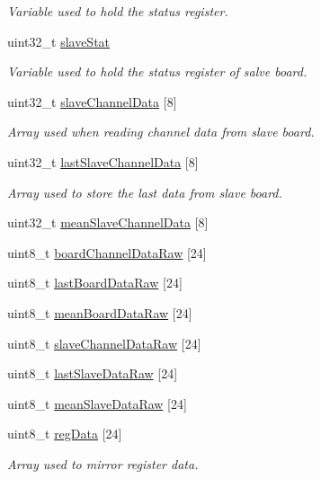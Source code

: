 \begin{DoxyCompactItemize}
\begin{DoxyCompactList}\small\item\em Variable used to hold the status register. \end{DoxyCompactList}\item 
uint32\+\_\+t \hyperlink{group___a_d_s1299___library_ga107f0202d1ef78dcc5b63e143044ffdf}{slave\+Stat}
\begin{DoxyCompactList}\small\item\em Variable used to hold the status register of salve board. \end{DoxyCompactList}\item 
uint32\+\_\+t \hyperlink{group___a_d_s1299___library_ga35a75511ee01afa88d18d47b2a6b401b}{slave\+Channel\+Data} \mbox{[}8\mbox{]}
\begin{DoxyCompactList}\small\item\em Array used when reading channel data from slave board. \end{DoxyCompactList}\item 
uint32\+\_\+t \hyperlink{group___a_d_s1299___library_gaf412b1daf072ddca4def438f97d2c65c}{last\+Slave\+Channel\+Data} \mbox{[}8\mbox{]}
\begin{DoxyCompactList}\small\item\em Array used to store the last data from slave board. \end{DoxyCompactList}\item 
uint32\+\_\+t \hyperlink{group___a_d_s1299___library_ga07120ea83782df5ae895c52616d4b26c}{mean\+Slave\+Channel\+Data} \mbox{[}8\mbox{]}
\item 
uint8\+\_\+t \hyperlink{group___a_d_s1299___library_gaa891a075c92bada339ffdb3a6f8c5ac8}{board\+Channel\+Data\+Raw} \mbox{[}24\mbox{]}
\item 
uint8\+\_\+t \hyperlink{group___a_d_s1299___library_ga7a5c129fa297decd31d1b5b2860b3b6f}{last\+Board\+Data\+Raw} \mbox{[}24\mbox{]}
\item 
uint8\+\_\+t \hyperlink{group___a_d_s1299___library_ga22acd6ef87276d02b78757e4fdcb6d2d}{mean\+Board\+Data\+Raw} \mbox{[}24\mbox{]}
\item 
uint8\+\_\+t \hyperlink{group___a_d_s1299___library_gafe36c371f2977643715e7d7c88465098}{slave\+Channel\+Data\+Raw} \mbox{[}24\mbox{]}
\item 
uint8\+\_\+t \hyperlink{group___a_d_s1299___library_ga72ed7b344555cffff8c860e89e44afd6}{last\+Slave\+Data\+Raw} \mbox{[}24\mbox{]}
\item 
uint8\+\_\+t \hyperlink{group___a_d_s1299___library_gafc7614ccf46f25b6620258370c5d1cf5}{mean\+Slave\+Data\+Raw} \mbox{[}24\mbox{]}
\item 
uint8\+\_\+t \hyperlink{group___a_d_s1299___library_ga534b53fd562140cae3041013449d27a1}{reg\+Data} \mbox{[}24\mbox{]}
\begin{DoxyCompactList}\small\item\em Array used to mirror register data. \end{DoxyCompactList}\end{DoxyCompactItemize}


